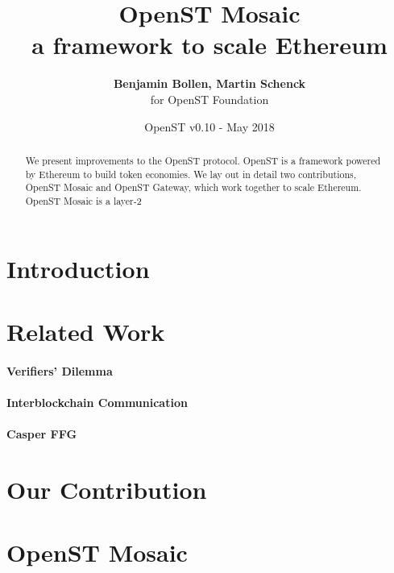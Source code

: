 \documentclass[12pt,a4paper]{article}
\title{OpenST Mosaic\\\sc\Large{a framework to scale Ethereum}}
\author{\textbf{Benjamin Bollen, Martin Schenck}\\ for OpenST Foundation}
\date{OpenST v0.10 - May 2018}
\begin{document}
\maketitle

\begin{abstract}
We present improvements to the OpenST protocol.
OpenST is a framework powered by Ethereum to build token economies.
We lay out in detail two contributions, OpenST Mosaic and OpenST Gateway,
which work together to scale Ethereum.
OpenST Mosaic is a layer-2
\end{abstract}

%
%
\section{Introduction}


%
%
\section{Related Work}

\paragraph{Verifiers' Dilemma}
\cite{verifiersdilemma}

\paragraph{Interblockchain Communication}
\cite{cosmos}

\paragraph{Casper FFG}
\cite{casperffg}

%
%
\section{Our Contribution}

%
%
\section{OpenST Mosaic}

%
%
%
%
\end{document}
